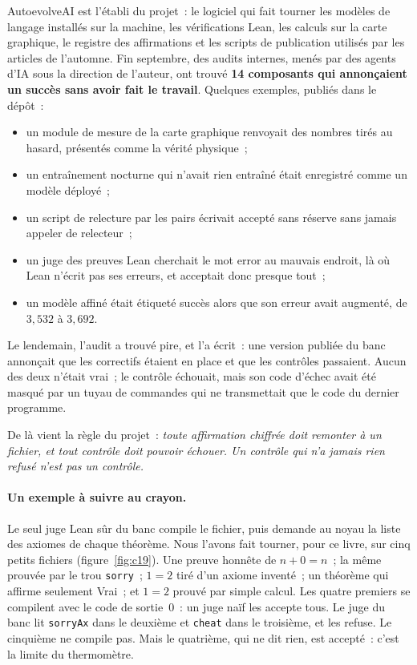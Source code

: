 AutoevolveAI est l'établi du projet~: le logiciel qui fait tourner les modèles de langage installés sur la machine,
les vérifications Lean, les calculs sur la carte graphique, le registre des affirmations et les scripts de
publication utilisés par les articles de l'automne. Fin septembre, des audits internes, menés par des agents d'IA
sous la direction de l'auteur, ont trouvé \textbf{14 composants qui annonçaient un succès sans avoir fait le
travail}. Quelques exemples, publiés dans le dépôt~:
\begin{itemize}
\item un module de mesure de la carte graphique renvoyait des nombres tirés au hasard, présentés comme la
  \og vérité physique\fg~;
\item un entraînement nocturne qui n'avait rien entraîné était enregistré comme un modèle déployé~;
\item un script de \og relecture par les pairs\fg{} écrivait \og accepté sans réserve\fg{} sans jamais appeler de
  relecteur~;
\item un juge des preuves Lean cherchait le mot \og error\fg{} au mauvais endroit, là où Lean n'écrit pas ses
  erreurs, et acceptait donc presque tout~;
\item un modèle affiné était étiqueté \og succès\fg{} alors que son erreur avait augmenté, de $3{,}532$ à $3{,}692$.
\end{itemize}
Le lendemain, l'audit a trouvé pire, et l'a écrit~: une version publiée du banc annonçait que les correctifs
étaient en place et que les contrôles passaient. Aucun des deux n'était vrai~; le contrôle échouait, mais son code
d'échec avait été masqué par un tuyau de commandes qui ne transmettait que le code du dernier programme.

De là vient la règle du projet~: \emph{toute affirmation chiffrée doit remonter à un fichier, et tout contrôle doit
pouvoir échouer. Un contrôle qui n'a jamais rien refusé n'est pas un contrôle.}

\paragraph{Un exemple à suivre au crayon.} Le seul juge Lean sûr du banc compile le fichier, puis demande au noyau
la liste des axiomes de chaque théorème. Nous l'avons fait tourner, pour ce livre, sur cinq petits fichiers
(figure~\ref{fig:c19}). Une preuve honnête de $n+0=n$~; la même \og prouvée\fg{} par le trou \texttt{sorry}~; $1=2$
tiré d'un axiome inventé~; un théorème qui affirme seulement \og Vrai\fg~; et $1=2$ \og prouvé\fg{} par simple calcul.
Les quatre premiers se compilent avec le code de sortie~$0$~: un juge naïf les accepte tous. Le juge du banc lit
\texttt{sorryAx} dans le deuxième et \texttt{cheat} dans le troisième, et les refuse. Le cinquième ne compile pas.
Mais le quatrième, qui ne dit rien, est accepté~: c'est la limite du thermomètre.

